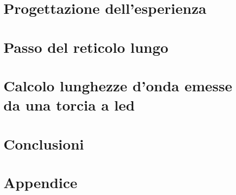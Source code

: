 \documentclass{article}
\begin{document}
\section{Progettazione dell'esperienza}


\section{Passo del reticolo lungo}

\section{Calcolo lunghezze d'onda emesse da una torcia a led}

\section{Conclusioni}

\section{Appendice}
\end{document}
